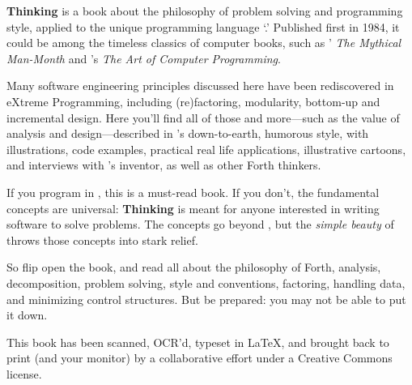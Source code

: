 
\noindent
\textbf{Thinking \Forth{}} is a book about the philosophy of problem
solving and programming style, applied to the unique programming
language `\Forth{}.' Published first in 1984, it could be among the
timeless classics of computer books, such as '
\emph{The Mythical Man-Month} and 's \emph{The
Art of Computer Programming}.

Many software engineering principles discussed here have been
rediscovered in eXtreme Programming, including (re)factoring,
modularity, bottom-up and incremental design.  Here you'll find all of
those and more---such as the value of analysis and design---described
in 's down-to-earth, humorous style, with
illustrations, code examples, practical real life applications,
illustrative cartoons, and interviews with \Forth{}'s inventor,
 as well as other Forth thinkers.

If you program in \Forth{}, this is a must-read book.  If you don't,
the fundamental concepts are universal: \textbf{Thinking \Forth{}} is
meant for anyone interested in writing software to solve problems.
The concepts go beyond \Forth{}, but the \emph{simple beauty} of
\Forth{} throws those concepts into stark relief.

So flip open the book, and read all about the philosophy of Forth,
analysis, decomposition, problem solving, style and conventions,
factoring, handling data, and minimizing control structures.  But be
prepared: you may not be able to put it down.

\medskip
This book has been scanned, OCR'd, typeset in \LaTeX{}, and brought
back to print (and your monitor) by a collaborative effort under a Creative
Commons license.

